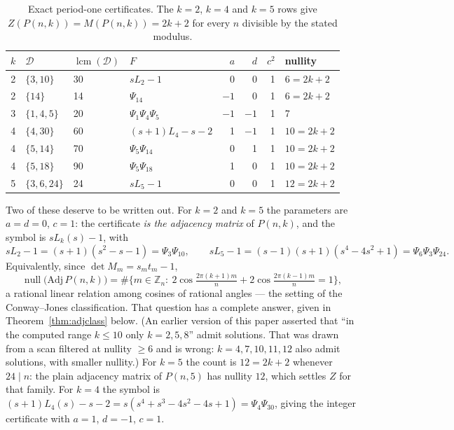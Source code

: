\documentclass[11pt]{article}
\theoremstyle{definition}
\begin{document}
\begin{table}[h]\centering
\begin{tabular}{clllrrrl}
\toprule
$k$ & $\mathcal D$ & $\operatorname{lcm}(\mathcal D)$ & $F$ & $a$ & $d$ & $c^{2}$ & nullity \\
\midrule
2 & $\{3,10\}$  & 30 & $sL_2-1$            & 0 & 0 & 1 & $6=2k+2$ \\
2 & $\{14\}$    & 14 & $\Psi_{14}$         & $-1$ & 0 & 1 & $6=2k+2$ \\
3 & $\{1,4,5\}$ & 20 & $\Psi_1\Psi_4\Psi_5$ & $-1$ & $-1$ & 1 & 7 \\
4 & $\{4,30\}$  & 60 & $(s+1)L_4-s-2$      & 1 & $-1$ & 1 & $10=2k+2$ \\
4 & $\{5,14\}$  & 70 & $\Psi_5\Psi_{14}$    & 0 & 1 & 1 & $10=2k+2$ \\
4 & $\{5,18\}$  & 90 & $\Psi_5\Psi_{18}$    & 1 & 0 & 1 & $10=2k+2$ \\
5 & $\{3,6,24\}$& 24 & $sL_5-1$            & 0 & 0 & 1 & $12=2k+2$ \\
\bottomrule
\end{tabular}
\caption{Exact period-one certificates. The $k=2$, $k=4$ and $k=5$ rows give
$Z(P(n,k))=M(P(n,k))=2k+2$ for every $n$ divisible by the stated modulus.}
\end{table}

\noindent
Two of these deserve to be written out. For $k=2$ and $k=5$ the parameters are
$a=d=0$, $c=1$: the certificate \emph{is the adjacency matrix} of $P(n,k)$, and
the symbol is $sL_k(s)-1$, with
\[
  sL_2-1=(s+1)(s^{2}-s-1)=\Psi_3\Psi_{10},\qquad
  sL_5-1=(s-1)(s+1)(s^{4}-4s^{2}+1)=\Psi_6\Psi_3\Psi_{24}.
\]
Equivalently, since $\det M_m=s_mt_m-1$,
\[
  \operatorname{null}\big(\mathrm{Adj}\,P(n,k)\big)
  =\#\Big\{m\in\mathbb Z_n:\
  2\cos\tfrac{2\pi(k+1)m}{n}+2\cos\tfrac{2\pi(k-1)m}{n}=1\Big\},
\]
a rational linear relation among cosines of rational angles --- the setting of
the Conway--Jones classification. That question has a complete answer, given in
Theorem~\ref{thm:adjclass} below. (An earlier version of this paper asserted
that ``in the computed range $k\le10$ only $k=2,5,8$'' admit solutions. That
was drawn from a scan filtered at nullity $\ge6$ and is wrong: $k=4,7,10,11,12$
also admit solutions, with smaller nullity.) For $k=5$ the count is $12=2k+2$ whenever
$24\mid n$: the plain adjacency matrix of $P(n,5)$ has nullity $12$, which
settles $Z$ for that family. For $k=4$ the symbol is
$(s+1)L_4(s)-s-2=s(s^{4}+s^{3}-4s^{2}-4s+1)=\Psi_4\Psi_{30}$, giving the
integer certificate with $a=1$, $d=-1$, $c=1$.
\end{document}
